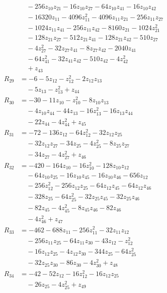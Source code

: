 \begin{align*}
&\quad -256z_{10}z_{21} -16z_{10}z_{27} -64z_{10}z_{41} -16z_{10}z_{42} \\
&\quad -16320z_{11} -4096z_{11}^{2} -4096z_{11}z_{21} -256z_{11}z_{27} \\
&\quad -1024z_{11}z_{41} -256z_{11}z_{42} -8160z_{21} -1024z_{21}^{2} \\
&\quad -128z_{21}z_{27} -512z_{21}z_{41} -128z_{21}z_{42} -510z_{27} \\
&\quad -4z_{27}^{2} -32z_{27}z_{41} -8z_{27}z_{42} -2040z_{41} \\
&\quad -64z_{41}^{2} -32z_{41}z_{42} -510z_{42} -4z_{42}^{2} \\
&\quad +z_{43} \\
R_{29} &= -6 -5z_{12} -z_{12}^{2} -2z_{12}z_{13} \\
&\quad -5z_{13} -z_{13}^{2} +z_{44} \\
R_{30} &= -30 -11z_{10} -z_{10}^{2} -8z_{10}z_{13} \\
&\quad -4z_{10}z_{44} -44z_{13} -16z_{13}^{2} -16z_{13}z_{44} \\
&\quad -22z_{44} -4z_{44}^{2} +z_{45} \\
R_{31} &= -72 -136z_{12} -64z_{12}^{2} -32z_{12}z_{25} \\
&\quad -32z_{12}z_{27} -34z_{25} -4z_{25}^{2} -8z_{25}z_{27} \\
&\quad -34z_{27} -4z_{27}^{2} +z_{46} \\
R_{32} &= -420 -164z_{10} -16z_{10}^{2} -128z_{10}z_{12} \\
&\quad -64z_{10}z_{25} -16z_{10}z_{45} -16z_{10}z_{46} -656z_{12} \\
&\quad -256z_{12}^{2} -256z_{12}z_{25} -64z_{12}z_{45} -64z_{12}z_{46} \\
&\quad -328z_{25} -64z_{25}^{2} -32z_{25}z_{45} -32z_{25}z_{46} \\
&\quad -82z_{45} -4z_{45}^{2} -8z_{45}z_{46} -82z_{46} \\
&\quad -4z_{46}^{2} +z_{47} \\
R_{33} &= -462 -688z_{11} -256z_{11}^{2} -32z_{11}z_{12} \\
&\quad -256z_{11}z_{25} -64z_{11}z_{30} -43z_{12} -z_{12}^{2} \\
&\quad -16z_{12}z_{25} -4z_{12}z_{30} -344z_{25} -64z_{25}^{2} \\
&\quad -32z_{25}z_{30} -86z_{30} -4z_{30}^{2} +z_{48} \\
R_{34} &= -42 -52z_{12} -16z_{12}^{2} -16z_{12}z_{25} \\
&\quad -26z_{25} -4z_{25}^{2} +z_{49} \\

\end{align*}
